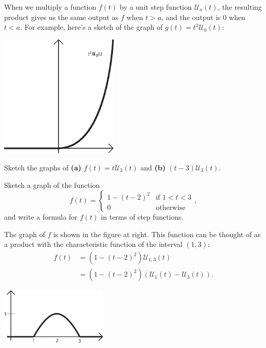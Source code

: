 {When we multiply a function $f(t)$ by a unit step function $\mathcal{U}_a(t)$, the resulting product gives us the same output as $f$ when $t>a$, and the output is $0$ when $t<a$.  For example, here's a sketch of the graph of $g(t)=t^2 \mathcal{U}_0(t)$:

\begin{center}
\includegraphics[width=2.25in]{11-laplaceII/stepfunction4.eps}
\end{center}

\begin{exe} Sketch the graphs of {\bf (a)} $f(t)=t \mathcal{U}_3(t)$ and {\bf (b)} $(t-3) \mathcal{U}_3(t)$.
\end{exe}

\example Sketch a graph of the function 
\[ f(t) = \begin{cases} 1-(t-2)^2 & \mbox{if } 1 < t < 3 \\ 0 & \mbox{otherwise} \end{cases},\] 
and write a formula for $f(t)$ in terms of step functions.

\medskip
\noindent
\begin{minipage}{4in}
\hspace{0.25in} The graph of $f$ is shown in the figure at right.  This function can be thought of as a product with the characteristic function of the interval $(1,3)$:
\begin{align*}
f(t) & = (1-(t-2)^2)\mathcal{U}_{1,3}(t) \\
& = (1-(t-2)^2)\left( \mathcal{U}_1(t) - \mathcal{U}_3(t) \right).
\end{align*}
\end{minipage}
\hspace{0.25in}
\begin{minipage}{2in}
\includegraphics[width=2in]{11-laplaceII/stepfunction7.eps}
\end{minipage}

}
